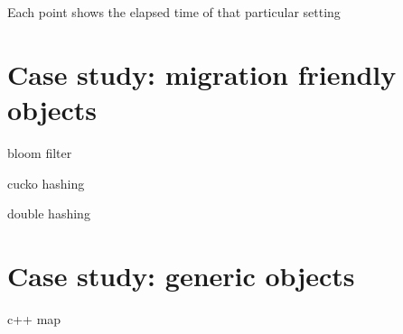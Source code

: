 Each point shows the elapsed time of that particular setting


\section{Case study: migration friendly objects}

bloom filter

cucko hashing

double hashing

\section{Case study: generic objects}

c++ map



